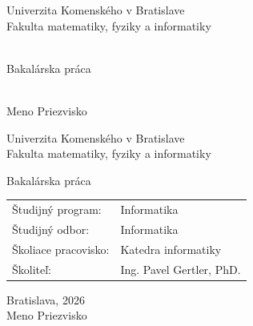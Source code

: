 \documentclass[12pt, oneside]{book}  %
\def\mfrok{2026}
\def\mfnazov{}
\def\mftyp{Bakalárska práca}
\def\mfautor{Meno Priezvisko}
\def\mfskolitel{Ing. Pavel Gertler, PhD. }
\def\mfkonzultant{tit. Meno Priezvisko, tit. }
\def\mfmiesto{Bratislava, \mfrok}
\def\mfodbor{ Informatika }
\def\program{ Informatika }
\def\mfpracovisko{ Katedra informatiky }
\begin{document}
     
\frontmatter
\pagestyle{empty}


\begin{center}
\sc\large
Univerzita Komenského v Bratislave\\
Fakulta matematiky, fyziky a informatiky

\vfill

{\LARGE\mfnazov}\\
\mftyp
\end{center}

\vfill

{\sc\large 
\noindent \mfrok\\
\mfautor
}

\cleardoublepage



\noindent

\begin{center}
\sc  
\large
Univerzita Komenského v Bratislave\\
Fakulta matematiky, fyziky a informatiky

\vfill

{\LARGE\mfnazov}
\mftyp
\end{center}

\vfill

\noindent
\begin{tabular}{ll}
Študijný program: & \program \\
Študijný odbor: & \mfodbor \\
Školiace pracovisko: & \mfpracovisko \\
Školiteľ: & \mfskolitel \\
\end{tabular}

\vfill


\noindent \mfmiesto\\
\mfautor

\cleardoublepage



\newpage 
\setcounter{page}{3}


\end{document}
